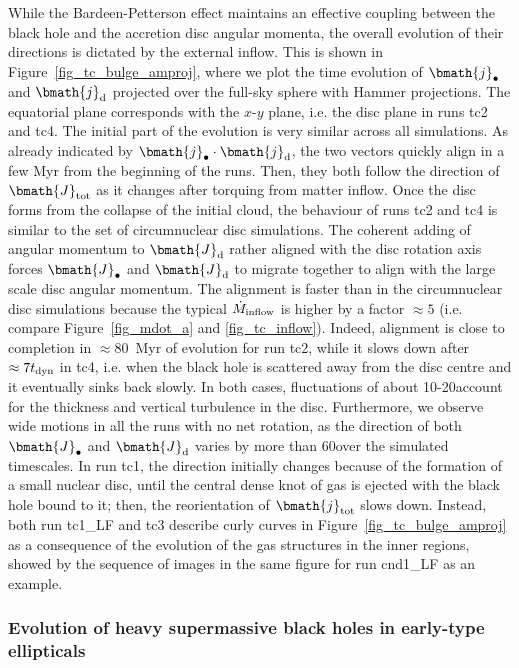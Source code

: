 \documentclass[a4paper,fleqn,usenatbib]{mnras}
\begin{document}
While the Bardeen-Petterson effect maintains an effective coupling between the black hole and the accretion disc angular momenta, the overall evolution of their directions is dictated by the external inflow.
This is shown in Figure~\ref{fig_tc_bulge_amproj}, where we plot the time evolution of $\bmath{j}_{\bullet}$ and $\bmath{j}_{\rm d}$ projected over the full-sky sphere with Hammer projections.
The equatorial plane corresponds with the $x$-$y$ plane, i.e. the disc plane in runs tc2 and tc4.
The initial part of the evolution is very similar across all simulations.
As already indicated by $\bmath{j}_{\bullet} \cdot \bmath{j}_{\rm d}$, the two vectors quickly align in a few Myr from the beginning of the runs.
Then, they both follow the direction of $\bmath{J}_{\rm tot}$ as it changes after torquing from matter inflow.
Once the disc forms from the collapse of the initial cloud, the behaviour of runs tc2 and tc4 is similar to the set of circumnuclear disc simulations.
The coherent adding of angular momentum to $\bmath{J}_{\rm d}$ rather aligned with the disc rotation axis forces $\bmath{J}_{\bullet}$ and $\bmath{J}_{\rm d}$ to migrate together to align with the large scale disc angular momentum.
The alignment is faster than in the circumnuclear disc simulations because the typical $\dot{M}_{\rm inflow}$ is higher by a factor $\approx 5$ (i.e. compare Figure~\ref{fig_mdot_a} and \ref{fig_tc_inflow}).
Indeed, alignment is close to completion in $\approx 80$~Myr of evolution for run tc2, while it slows down after $\approx 7 t_{\rm dyn}$ in tc4, i.e. when the black hole is scattered away from the disc centre and it eventually sinks back slowly.
In both cases, fluctuations of about 10-20\degr account for the thickness and vertical turbulence in the disc.
Furthermore, we observe wide motions in all the runs with no net rotation, as the direction of both $\bmath{J}_{\bullet}$ and $\bmath{J}_{\rm d}$ varies by more than 60\degr over the simulated timescales.
In run tc1, the direction initially changes because of the formation of a small nuclear disc, until the central dense knot of gas is ejected with the black hole bound to it; then, the reorientation of $\bmath{j}_{\rm tot}$ slows down.
Instead, both run tc1\_LF and tc3 describe curly curves in Figure~\ref{fig_tc_bulge_amproj} as a consequence of the evolution of the gas structures in the inner regions, showed by the sequence of images in the same figure for run cnd1\_LF as an example.

\subsubsection{Evolution of heavy supermassive black holes in early-type ellipticals}
\end{document}

